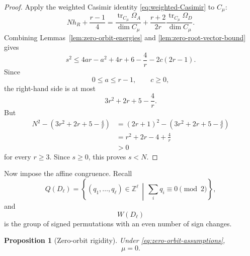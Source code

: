 \documentclass[11pt]{amsart}
\newtheorem{proposition}[theorem]{Proposition}
\theoremstyle{remark}
\numberwithin{equation}{section}
\begin{document}
\begin{proof}
Apply the weighted Casimir identity
\eqref{eq:weighted-Casimir} to \(C_\mu\):
\[
   Nh_R+\frac{r-1}{4}
   =
   \frac{\operatorname{tr}_{C_\mu}\Omega_A}{\dim C_\mu}
   +
   \frac{r+2}{2r}
   \frac{\operatorname{tr}_{C_\mu}\Omega_D}{\dim C_\mu}.
\]
Combining Lemmas~\ref{lem:zero-orbit-energies} and
\ref{lem:zero-root-vector-bound} gives
\begin{equation}
   s^2
   \le
   4ar-a^2
   +4r+6-\frac4r
   -2c(2r-1).
\end{equation}
Since
\[
   0\le a\le r-1,
   \qquad
   c\ge0,
\]
the right-hand side is at most
\[
   3r^2+2r+5-\frac4r.
\]
But
\[
\begin{aligned}
   N^2-
   \left(
      3r^2+2r+5-\frac4r
   \right)
   &=
   (2r+1)^2-
   \left(
      3r^2+2r+5-\frac4r
   \right)\\
   &=
   r^2+2r-4+\frac4r\\
   &>0
\end{aligned}
\]
for every \(r\ge3\).  Since \(s\ge0\), this proves \(s<N\).
\end{proof}

Now impose the affine congruence.  Recall
\[
   Q(D_\ell)
   =
   \left\{
      (q_1,\ldots,q_\ell)\in\mathbb Z^\ell
      \,\middle|\,
      \sum_iq_i\equiv0\pmod2
   \right\},
\]
and
\[
   W(D_\ell)
\]
is the group of signed permutations with an even number of sign changes.

\begin{proposition}[Zero-orbit rigidity]
\label{prop:zero-orbit-rigidity}
Under \eqref{eq:zero-orbit-assumptions},
\[
   \mu=0.
\]
\end{proposition}
\end{document}
